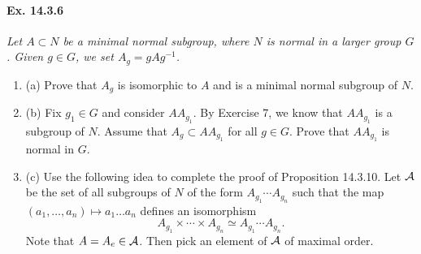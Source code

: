 \documentclass[11pt,a4paper]{article}
\newcommand{\be} {\begin{enumerate}}
\newcommand{\ee} {\end{enumerate}}
\begin{document}
\paragraph{Ex. 14.3.6}{\it Let $A \subset N$ be a minimal normal subgroup, where $N$ is normal in a larger group $G$. Given $g \in G$, we set $A_g = gAg^{-1}$.
\be
\item[(a)] Prove that $A_g$ is isomorphic to $A$ and is a minimal normal subgroup of $N$.
\item[(b)] Fix $g_1 \in G$ and consider $AA_{g_1}$. By Exercise 7, we know that $AA_{g_1}$ is a subgroup of $N$. Assume that $A_g \subset AA_{g_1}$ for all $g \in G$. Prove that $AA_{g_1}$ is normal in $G$.
\item[(c)]Use the following idea to complete the proof of Proposition 14.3.10. Let $\cal A$ be the set of all subgroups of $N$ of the form $A_{g_1}\cdots A_{g_n}$ such that the map $(a_1,\ldots,a_n) \mapsto a_1\ldots a_n$ defines an isomorphism
$$A_{g_1}\times\cdots\times A_{g_n} \simeq A_{g_1}\cdots A_{g_n}.$$
Note that $A = A_e \in {\cal A}$. Then pick an element of $\cal A$ of maximal order.
\ee
}
\end{document}
